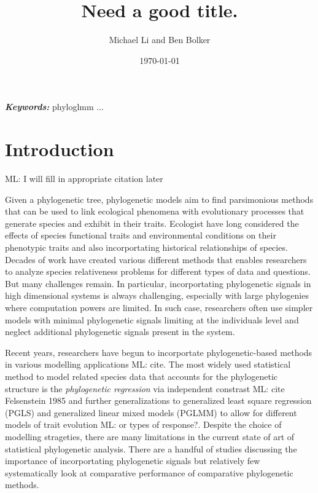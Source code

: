 \documentclass[12pt]{article}
\title{Need a good title.}
\author{Michael Li and Ben Bolker}
\date{\today}
\providecommand{\keywords}[1]{\textbf{\textit{Keywords:}} #1}
\begin{document}
\newcommand{\dbic}{\ensuremath \Delta \textrm{BIC}}

\newcommand{\bmbhide}[1]{}
\newcommand{\bmb}[1]{{\color{blue} BB: #1}}

\newcommand{\fref}[1]{Figure~\ref{fig:#1}}

\newcommand{\ml}[1]{{\color{red} ML: #1}}

\newcommand{\add}[1]{{\color{blue} ADD: #1}}

\maketitle

\doublespacing

\keywords{phyloglmm ... }

\section{Introduction}
\ml{I will fill in appropriate citation later}


Given a phylogenetic tree, phylogenetic models aim to find parsimonious methods that can be used to link ecological phenomena with evolutionary processes that generate species and exhibit in their traits.
Ecologist have long considered the effects of species functional traits and environmental conditions on their phenotypic traits and also incorportating historical relationships of species.
Decades of work have created various different methods that enables researchers to analyze species relativeness problems for different types of data and questions.
But many challenges remain.
In particular, incorportating phylogenetic signals in high dimensional systems is always challenging, especially with large phylogenies where computation powers are limited.
In such case, researchers often use simpler models with minimal phylogenetic signals limiting at the individuals level and neglect additional phylogenetic signals present in the system.

Recent years, researchers have begun to incorportate phylogenetic-based methods in various modelling applications \ml{cite}.
The most widely used statistical method to model related species data that accounts for the phylogenetic structure is the \textit{phylogenetic regression} via independent constrast \ml{cite Felsenstein 1985} and further generalizations to generalized least square regression (PGLS) and generalized linear mixed models (PGLMM) to allow for different models of trait evolution \ml{or types of response?}. 
Despite the choice of modelling strageties, there are many limitations in the current state of art of statistical phylogenetic analysis.
There are a handful of studies discussing the importance of incorportating phylogenetic signals but relatively few systematically look at comparative performance of comparative phylogenetic methods. 
\end{document}
